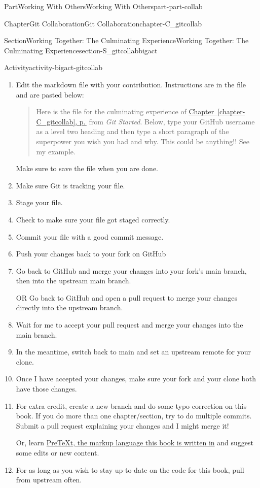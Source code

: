 \documentclass[twoside,10pt,]{book}
\newcommand{\xreffont}{\relax}
\newcommand{\pubtitle}[1]{\textsl{#1}}
\begin{document}
\begin{partptx}{Part}{Working With Others}{}{Working With Others}{}{}{part-part-collab}
\begin{chapterptx}{Chapter}{Git Collaboration}{}{Git Collaboration}{}{}{chapter-C_gitcollab}
\begin{sectionptx}{Section}{Working Together: The Culminating Experience}{}{Working Together: The Culminating Experience}{}{}{section-S_gitcollabbigact}
\begin{activity}{Activity}{}{activity-bigact-gitcollab}
\begin{enumerate}[font=\bfseries,label=(\alph*),ref=\alph*]
\item{}Edit the markdown file with your contribution. Instructions are in the file and are pasted below:%
\begin{quote}%
Here is the file for the culminating experience of \hyperref[chapter-C_gitcollab]{Chapter~{\xreffont\ref{chapter-C_gitcollab}}, p.\,\pageref{chapter-C_gitcollab}} from \pubtitle{Git Started}. Below, type your GitHub username as a level two heading and then type a short paragraph of the superpower you wish you had and why. This could be anything!! See my example.%
\end{quote}
Make sure to save the file when you are done.%
\item{}Make sure Git is tracking your file.%
\item{}Stage your file.%
\item{}Check to make sure your file got staged correctly.%
\item{}Commit your file with a good commit message.%
\item{}Push your changes back to your fork on GitHub%
\item{}Go back to GitHub and merge your changes into your fork's main branch, then into the upstream main branch.%
\par
OR Go back to GitHub and open a pull request to merge your changes directly into the upstream branch.%
\item{}Wait for me to accept your pull request and merge your changes into the main branch.%
\item{}In the meantime, switch back to main and set an upstream remote for your clone.%
\item{}Once I have accepted your changes, make sure your fork and your clone both have those changes.%
\item{}For extra credit, create a new branch and do some typo correction on this book. If you do more than one chapter\slash{}section, try to do multiple commits. Submit a pull request explaining your changes and I might merge it!%
\par
Or, learn \href{https://pretextbook.org}{PreTeXt, the markup language this book is written in}\footnotemark{} and suggest some edits or new content.%
\item{}For as long as you wish to stay up-to-date on the code for this book, pull from upstream often.%
\end{enumerate}%
\end{activity}%
%

\end{sectionptx}
\end{chapterptx}
\end{partptx}
\end{document}
